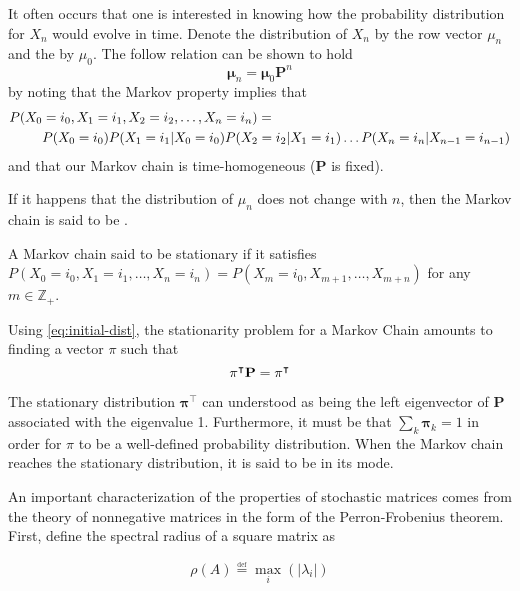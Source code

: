 It often occurs that one is interested in knowing how the probability distribution
for $X_n$ would evolve in time.  Denote the
distribution of $X_n$ by the row vector $\mu_n$ and the 
by $\mu_0$. The follow relation can be shown to hold
\begin{equation}
 \mathbf{\mu}_n= \mathbf{\mu}_0 \mathbf{P}^n \label{eq:initial-dist}
\end{equation}
by noting that the Markov property implies that
\begin{align}
P(X_0 &= i_0, X_1 = i_1, X_2 = i_2, \dots, X_n = i_n) = \notag \\
&P(X_0 = i_0) P(X_1 = i_1 | X_0 = i_0) P(X_2 = i_2 | X_1 = i_1) \dots P(X_n = i_n |
X_{n-1} = i_{n-1})
\end{align}
and that our Markov chain is time-homogeneous ($\mathbf{P}$ is fixed).

If it happens that the distribution of $\mu_n$ does not change with $n$, then 
 the Markov chain is said to be . 

\begin{defn}
A Markov chain said to be stationary if it satisfies $P(X_0 = i_0, X_1 = i_1, \dots, X_n
= i_n) = P(X_m = i_0, X_{m+1}, \dots, X_{m+n})$ for any $m \in \mathbb{Z_+}$.
\end{defn}

Using \ref{eq:initial-dist}, the stationarity problem for a Markov Chain amounts to
finding a vector $\pi$ such that
\begin{equation}
\mathbf{\pi}^\intercal \mathbf{P} = \mathbf{\pi}^\intercal
\end{equation}

The stationary distribution $\mathbf{\pi}^\intercal$ can understood as being the left
eigenvector of $\mathbf{P}$ associated with the eigenvalue 1. Furthermore, it must be
that $\sum_k \mathbf{\pi}_k = 1$ in order for $\pi$ to be a well-defined probability
distribution. When the Markov chain reaches the stationary distribution, it is said to be
in its  mode.

An important characterization of the properties of stochastic matrices comes from the
theory of nonnegative matrices in the form of the Perron-Frobenius theorem. First, define the spectral radius of a square matrix as

\begin{equation}
\rho(A) \overset{\underset{\mathrm{def}}{}}{=} \max_i(|\lambda_i|)
\end{equation}

